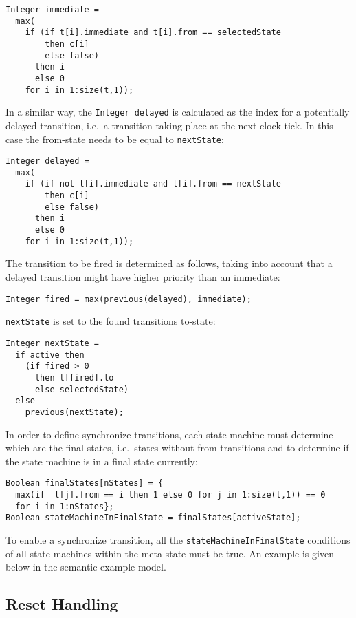 \begin{lstlisting}[language=modelica]
Integer immediate =
  max(
    if (if t[i].immediate and t[i].from == selectedState
        then c[i]
        else false)
      then i
      else 0
    for i in 1:size(t,1));
\end{lstlisting}

In a similar way, the \lstinline!Integer delayed! is calculated as the index for a
potentially delayed transition, i.e.\ a transition taking place at the
next clock tick. In this case the from-state needs to be equal to
\lstinline!nextState!:
\begin{lstlisting}[language=modelica]
Integer delayed =
  max(
    if (if not t[i].immediate and t[i].from == nextState
        then c[i]
        else false)
      then i
      else 0
    for i in 1:size(t,1));
\end{lstlisting}

The transition to be fired is determined as follows, taking into account
that a delayed transition might have higher priority than an immediate:
\begin{lstlisting}[language=modelica]
Integer fired = max(previous(delayed), immediate);
\end{lstlisting}
\lstinline!nextState! is set to the found transitions to-state:
\begin{lstlisting}[language=modelica]
Integer nextState =
  if active then
    (if fired > 0
      then t[fired].to
      else selectedState)
  else
    previous(nextState);
\end{lstlisting}
In order to define synchronize transitions, each state machine must
determine which are the final states, i.e.\ states without
from-transitions and to determine if the state machine is in a final
state currently:
\begin{lstlisting}[language=modelica]
Boolean finalStates[nStates] = {
  max(if  t[j].from == i then 1 else 0 for j in 1:size(t,1)) == 0
  for i in 1:nStates};
Boolean stateMachineInFinalState = finalStates[activeState];
\end{lstlisting}
To enable a synchronize transition, all the \lstinline!stateMachineInFinalState! conditions of all state machines within the meta state must be true.  An example is given below in the semantic example model.

\subsection{Reset Handling}\label{reset-handling}

